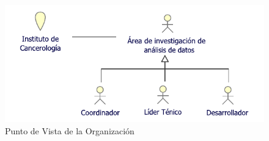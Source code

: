 \begin{figure}[h!]
	\centering
	\includegraphics[width=1\linewidth]{ARQUITECTURA/imgs/CapaNegocio/1_PvOrganizacion}
	\caption{Punto de Vista de la Organización}
	\label{PvOrganizacion}
\end{figure}

